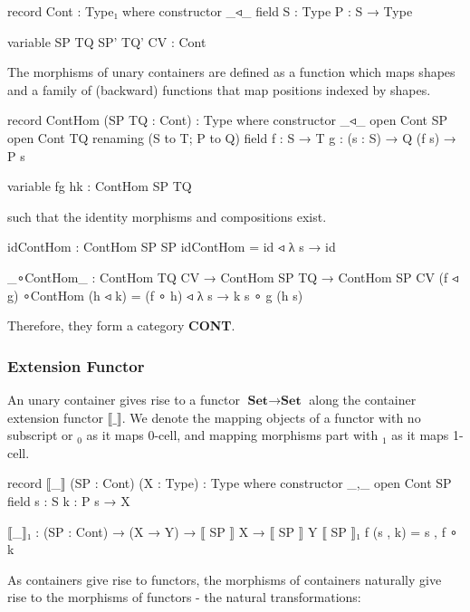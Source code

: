 \begin{code}
record Cont : Type₁ where
  constructor _◃_
  field
    S : Type
    P : S → Type
\end{code}

\begin{code}[hide]
variable SP TQ SP' TQ' CV : Cont
\end{code}

The morphisms of unary containers are defined as a function which maps shapes and a family of (backward) functions that map positions indexed by shapes.

\begin{code}
record ContHom (SP TQ : Cont) : Type where
  constructor _◃_
  open Cont SP
  open Cont TQ renaming (S to T; P to Q)
  field
    f : S → T
    g : (s : S) → Q (f s) → P s
\end{code}

\begin{code}[hide]
variable fg hk : ContHom SP TQ
\end{code}

such that the identity morphisms and compositions exist.

\begin{code}
idContHom : ContHom SP SP
idContHom = id ◃ λ s → id

_∘ContHom_ : ContHom TQ CV → ContHom SP TQ → ContHom SP CV
(f ◃ g) ∘ContHom (h ◃ k) = (f ∘ h) ◃ λ s → k s ∘ g (h s)
\end{code}

Therefore, they form a category \textbf{CONT}.

\subsubsection*{Extension Functor}

An unary container gives rise to a functor $\textbf{Set} \to \textbf{Set}$ along the container extension functor $\llbracket\_\rrbracket$. We denote the mapping objects of a functor with no subscript or $_0$ as it maps 0-cell, and mapping morphisms part with $_1$ as it maps 1-cell.

\begin{code}
record ⟦_⟧ (SP : Cont) (X : Type) : Type where
  constructor _,_
  open Cont SP
  field
    s : S
    k : P s → X

⟦_⟧₁ : (SP : Cont) → (X → Y) → ⟦ SP ⟧ X → ⟦ SP ⟧ Y
⟦ SP ⟧₁ f (s , k) = s , f ∘ k
\end{code}

As containers give rise to functors, the morphisms of containers naturally give rise to the morphisms of functors - the natural transformations:

